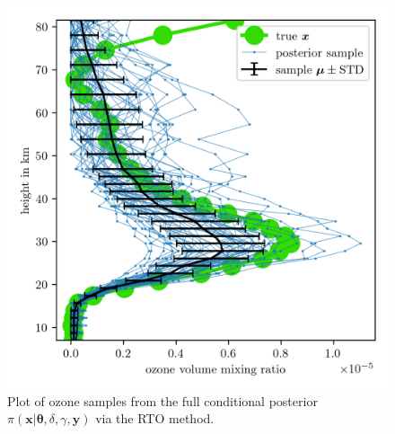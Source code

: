 \begin{figure}[ht!]
	\centering
	\includegraphics{FullO3Res.png}
	\caption[Pressure posterior samples.]{Plot of ozone samples from the full conditional posterior $\pi(\bm{x} | \bm{\theta},  \delta, \gamma, \bm{y})$ via the RTO method.}
	\label{fig:O3Post}
\end{figure}


\clearpage